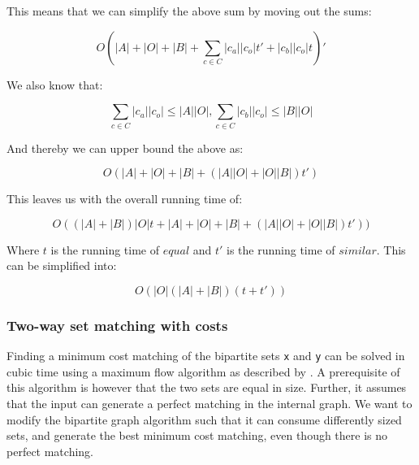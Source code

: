 \documentclass[11pt]{article}
\begin{document}
This means that we can simplify the above sum by moving out the sums:

\begin{equation}
O(|A| + |O| + |B| + \sum_{c \in C} |c_a||c_o|t' + |c_b||c_o|t)' \nonumber
\end{equation}

We also know that:

\begin{equation}
\sum_{c \in C} |c_a||c_o| \leq |A||O| , 
\sum_{c \in C} |c_b||c_o| \leq |B||O| \nonumber
\end{equation}

And thereby we can upper bound the above as:

\begin{equation}
O(|A| + |O| + |B| + (|A| |O| + |O| |B|) t') \nonumber
\end{equation}

This leaves us with the overall running time of:

\begin{equation}
O((|A| + |B|)|O|t + |A|+|O|+|B| + (|A| |O| + |O| |B|) t')) \nonumber
\end{equation}

Where $t$ is the running time of $equal$ and $t'$ is the running time of $similar$. This can be simplified into:

\begin{equation}
O(|O| (|A| + |B|)(t + t')) \nonumber
\end{equation}

\subsubsection{Two-way set matching with costs}
Finding a minimum cost matching of the bipartite sets \texttt{x} and \texttt{y} can be solved in cubic time using a maximum flow algorithm as described by \citet{bipartitecost}. A prerequisite of this algorithm is however that the two sets are equal in size. Further, it assumes that the input can generate a perfect matching in the internal graph. We want to modify the bipartite graph algorithm such that it can consume differently sized sets, and generate the best minimum cost matching, even though there is no perfect matching.
\end{document}
